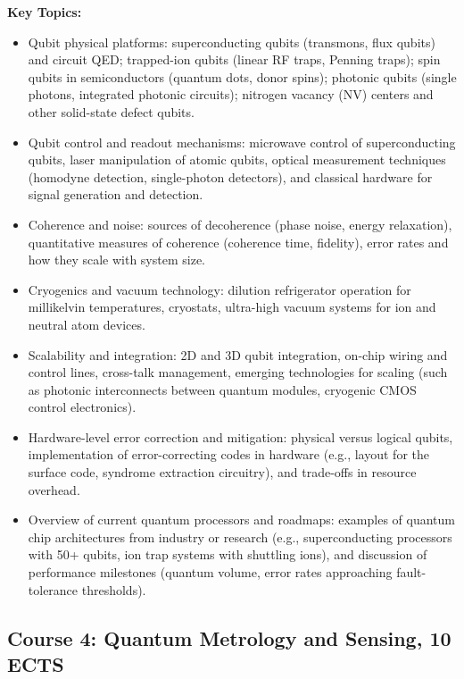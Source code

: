 \documentclass{scrreprt}
\begin{document}
\textbf{Key Topics:}
\begin{itemize}
\item Qubit physical platforms: superconducting qubits (transmons, flux qubits) and circuit QED; trapped-ion qubits (linear RF traps, Penning traps); spin qubits in semiconductors (quantum dots, donor spins); photonic qubits (single photons, integrated photonic circuits); nitrogen vacancy (NV) centers and other solid-state defect qubits.
\item Qubit control and readout mechanisms: microwave control of superconducting qubits, laser manipulation of atomic qubits, optical measurement techniques (homodyne detection, single-photon detectors), and classical hardware for signal generation and detection.
\item Coherence and noise: sources of decoherence (phase noise, energy relaxation), quantitative measures of coherence (coherence time, fidelity), error rates and how they scale with system size.
\item Cryogenics and vacuum technology: dilution refrigerator operation for millikelvin temperatures, cryostats, ultra-high vacuum systems for ion and neutral atom devices.
\item Scalability and integration: 2D and 3D qubit integration, on-chip wiring and control lines, cross-talk management, emerging technologies for scaling (such as photonic interconnects between quantum modules, cryogenic CMOS control electronics).
\item Hardware-level error correction and mitigation: physical versus logical qubits, implementation of error-correcting codes in hardware (e.g., layout for the surface code, syndrome extraction circuitry), and trade-offs in resource overhead.
\item Overview of current quantum processors and roadmaps: examples of quantum chip architectures from industry or research (e.g., superconducting processors with 50+ qubits, ion trap systems with shuttling ions), and discussion of performance milestones (quantum volume, error rates approaching fault-tolerance thresholds).
\end{itemize}

\subsection{Course 4: Quantum Metrology and Sensing, 10 ECTS}
\end{document}
